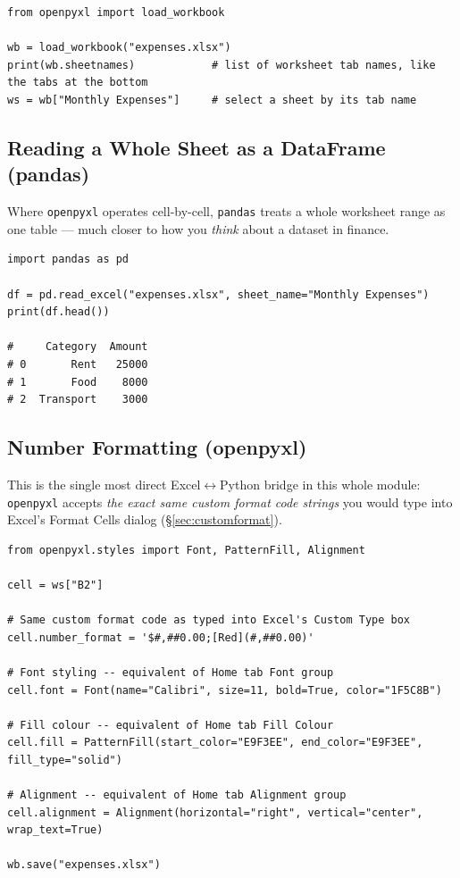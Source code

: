 \documentclass[11pt,a4paper]{article}
\begin{document}
\begin{lstlisting}[style=pythonstyle, caption={Opening an existing workbook, equivalent to File $\to$ Open}]
from openpyxl import load_workbook

wb = load_workbook("expenses.xlsx")
print(wb.sheetnames)            # list of worksheet tab names, like the tabs at the bottom
ws = wb["Monthly Expenses"]     # select a sheet by its tab name
\end{lstlisting}

\subsection{Reading a Whole Sheet as a DataFrame (pandas)}

Where \texttt{openpyxl} operates cell-by-cell, \texttt{pandas} treats a whole worksheet range as one table --- much closer to how you \emph{think} about a dataset in finance.

\begin{lstlisting}[style=pythonstyle, caption={Reading an Excel sheet into pandas}]
import pandas as pd

df = pd.read_excel("expenses.xlsx", sheet_name="Monthly Expenses")
print(df.head())

#     Category  Amount
# 0       Rent   25000
# 1       Food    8000
# 2  Transport    3000
\end{lstlisting}

\subsection{Number Formatting (openpyxl)}

This is the single most direct Excel$\leftrightarrow$Python bridge in this whole module: \texttt{openpyxl} accepts \emph{the exact same custom format code strings} you would type into Excel's Format Cells dialog (\S\ref{sec:customformat}).

\begin{lstlisting}[style=pythonstyle, caption={Applying Accounting/Currency format codes identical to Excel's}]
from openpyxl.styles import Font, PatternFill, Alignment

cell = ws["B2"]

# Same custom format code as typed into Excel's Custom Type box
cell.number_format = '$#,##0.00;[Red](#,##0.00)'

# Font styling -- equivalent of Home tab Font group
cell.font = Font(name="Calibri", size=11, bold=True, color="1F5C8B")

# Fill colour -- equivalent of Home tab Fill Colour
cell.fill = PatternFill(start_color="E9F3EE", end_color="E9F3EE", fill_type="solid")

# Alignment -- equivalent of Home tab Alignment group
cell.alignment = Alignment(horizontal="right", vertical="center", wrap_text=True)

wb.save("expenses.xlsx")
\end{lstlisting}
\end{document}
